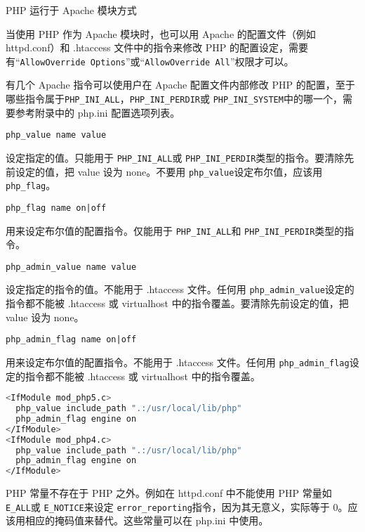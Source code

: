 \begin{compactitem}
\item PHP 运行于 Apache 模块方式

当使用 PHP 作为 Apache 模块时，也可以用 Apache 的配置文件（例如 httpd.conf）和 .htaccess 文件中的指令来修改 PHP 的配置设定，需要有“\texttt{AllowOverride Options}”或“\texttt{AllowOverride All}”权限才可以。

有几个 Apache 指令可以使用户在 Apache 配置文件内部修改 PHP 的配置，至于哪些指令属于\texttt{PHP\_INI\_ALL}，\texttt{PHP\_INI\_PERDIR}或 \texttt{PHP\_INI\_SYSTEM}中的哪一个，需要参考附录中的 php.ini 配置选项列表。

\begin{compactitem}
\item \texttt{php\_value name value}

设定指定的值。只能用于 \texttt{PHP\_INI\_ALL}或 \texttt{PHP\_INI\_PERDIR}类型的指令。要清除先前设定的值，把 value 设为 none。不要用 \texttt{php\_value}设定布尔值，应该用 \texttt{php\_flag}。

\item \texttt{php\_flag name on|off}

用来设定布尔值的配置指令。仅能用于 \texttt{PHP\_INI\_ALL}和 \texttt{PHP\_INI\_PERDIR}类型的指令。

\item \texttt{php\_admin\_value name value}

设定指定的指令的值。不能用于 .htaccess 文件。任何用 \texttt{php\_admin\_value}设定的指令都不能被 .htaccess 或 virtualhost 中的指令覆盖。要清除先前设定的值，把 value 设为 none。

\item \texttt{php\_admin\_flag name on|off}

用来设定布尔值的配置指令。不能用于 .htaccess 文件。任何用 \texttt{php\_admin\_flag}设定的指令都不能被 .htaccess 或 virtualhost 中的指令覆盖。
\end{compactitem}

\begin{lstlisting}[language=bash]
<IfModule mod_php5.c>
  php_value include_path ".:/usr/local/lib/php"
  php_admin_flag engine on
</IfModule>
<IfModule mod_php4.c>
  php_value include_path ".:/usr/local/lib/php"
  php_admin_flag engine on
</IfModule>
\end{lstlisting}

PHP 常量不存在于 PHP 之外。例如在 httpd.conf 中不能使用 PHP 常量如 \texttt{E\_ALL}或 \texttt{E\_NOTICE}来设定 \texttt{error\_reporting}指令，因为其无意义，实际等于 0。应该用相应的掩码值来替代。这些常量可以在 php.ini 中使用。


\end{compactitem}
